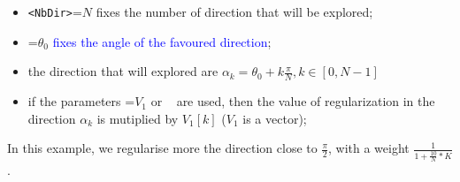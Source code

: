 \begin{itemize}
   \item  {\tt  <NbDir>}=$N$  fixes the number of direction that will be explored;
   \item  {\tt  <Teta0>}=$\theta_0$  \textcolor{blue}{fixes the angle of the favoured direction};
   \item  the direction that will explored are $\alpha_k=\theta_0 + k\frac{\pi}{N} , k\in[0,N-1]$
   \item if the parameters  {\tt <Px1MultRegul>}=$V_1$ or {\tt <Px2MultRegul> } are used, then the value
         of regularization in the direction  $\alpha_k$ is  mutiplied by $V_1[k]$ ($V_1$ is a vector);
\end{itemize}

In this example, we regularise more the direction close to $\frac{\pi}{2}$, with a weight
$\frac{1}{1+\frac{10}{N}*K}$.




